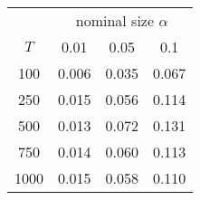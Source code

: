 % 
\begin{tabular}{cccc}
  \hline
  & \multicolumn{3}{c}{nominal size $\alpha$} \\
 $T$ & 0.01 & 0.05 & 0.1 \\
 \hline
100 & 0.006 & 0.035 & 0.067 \\ 
  250 & 0.015 & 0.056 & 0.114 \\ 
  500 & 0.013 & 0.072 & 0.131 \\ 
  750 & 0.014 & 0.060 & 0.113 \\ 
  1000 & 0.015 & 0.058 & 0.110 \\ 
   \hline
\end{tabular}
